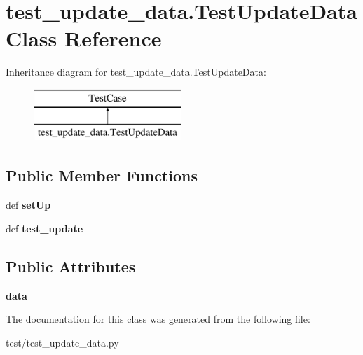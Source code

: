 \hypertarget{classtest__update__data_1_1_test_update_data}{\section{test\-\_\-update\-\_\-data.\-Test\-Update\-Data Class Reference}
\label{classtest__update__data_1_1_test_update_data}
}
Inheritance diagram for test\-\_\-update\-\_\-data.\-Test\-Update\-Data\-:\begin{figure}[H]
\begin{center}
\leavevmode
\includegraphics[height=2.000000cm]{classtest__update__data_1_1_test_update_data}
\end{center}
\end{figure}
\subsection*{Public Member Functions}
\begin{DoxyCompactItemize}
\item 
\hypertarget{classtest__update__data_1_1_test_update_data_a4c3c4d45fdcdce4fb85c64b024617bf6}{def {\bfseries set\-Up}}\label{classtest__update__data_1_1_test_update_data_a4c3c4d45fdcdce4fb85c64b024617bf6}

\item 
\hypertarget{classtest__update__data_1_1_test_update_data_aed110b33125f51888a168e265b8d72e9}{def {\bfseries test\-\_\-update}}\label{classtest__update__data_1_1_test_update_data_aed110b33125f51888a168e265b8d72e9}

\end{DoxyCompactItemize}
\subsection*{Public Attributes}
\begin{DoxyCompactItemize}
\item 
\hypertarget{classtest__update__data_1_1_test_update_data_a4902d5786ceeaded3ee22d4c5ffce6cc}{{\bfseries data}}\label{classtest__update__data_1_1_test_update_data_a4902d5786ceeaded3ee22d4c5ffce6cc}

\end{DoxyCompactItemize}


The documentation for this class was generated from the following file\-:\begin{DoxyCompactItemize}
\item 
test/test\-\_\-update\-\_\-data.\-py\end{DoxyCompactItemize}

